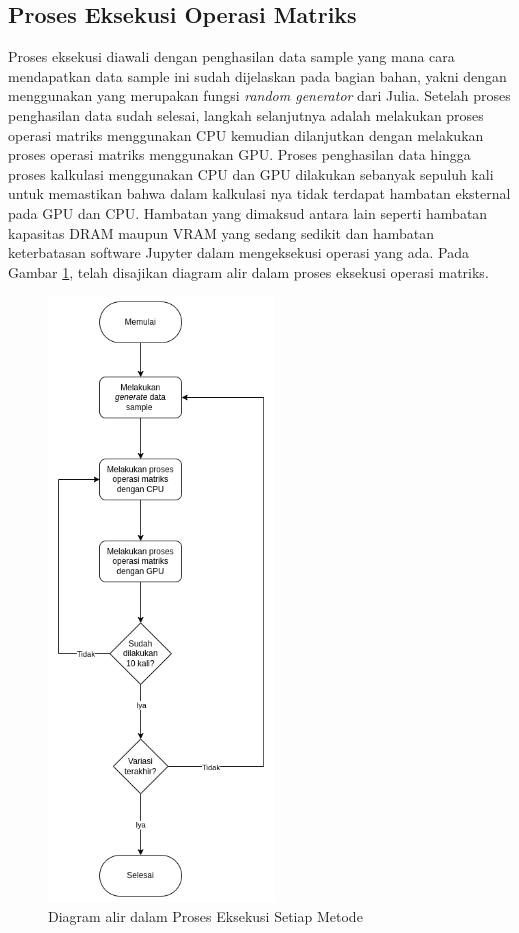 \subsection{Proses Eksekusi Operasi Matriks}

Proses eksekusi diawali dengan penghasilan data sample yang mana cara
mendapatkan data sample ini sudah dijelaskan pada bagian bahan, yakni dengan
menggunakan  yang merupakan fungsi \emph{random generator} dari
Julia. Setelah proses penghasilan data sudah selesai, langkah selanjutnya
adalah melakukan proses operasi matriks menggunakan CPU kemudian dilanjutkan
dengan melakukan proses operasi matriks menggunakan GPU. Proses penghasilan
data hingga proses kalkulasi menggunakan CPU dan GPU dilakukan sebanyak sepuluh
kali untuk memastikan bahwa dalam kalkulasi nya tidak terdapat hambatan
eksternal pada GPU dan CPU. Hambatan yang dimaksud antara lain seperti hambatan
kapasitas DRAM maupun VRAM yang sedang sedikit dan hambatan keterbatasan
software Jupyter dalam mengeksekusi operasi yang ada. Pada Gambar
\ref{img:methods_execution}, telah disajikan diagram alir dalam proses eksekusi
operasi matriks.

\begin{figure}[H]
	\centering
	\includegraphics[width=6cm, scale=1]{schema/langkah-2.drawio.png}
	\caption{Diagram alir dalam Proses Eksekusi Setiap Metode}
	\label{img:methods_execution}
\end{figure}

